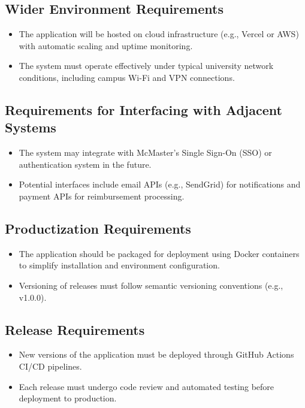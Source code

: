 \documentclass[12pt]{article}
\begin{document}
  \subsection{Wider Environment Requirements}
    \begin{itemize}
      \item The application will be hosted on cloud infrastructure (e.g., Vercel or AWS) with automatic scaling and uptime monitoring.
      \item The system must operate effectively under typical university network conditions, including campus Wi-Fi and VPN connections.
    \end{itemize}

  \subsection{Requirements for Interfacing with Adjacent Systems}
    \begin{itemize}
      \item The system may integrate with McMaster’s Single Sign-On (SSO) or authentication system in the future.
      \item Potential interfaces include email APIs (e.g., SendGrid) for notifications and payment APIs for reimbursement processing.
    \end{itemize}

  \subsection{Productization Requirements}
    \begin{itemize}
      \item The application should be packaged for deployment using Docker containers to simplify installation and environment configuration.
      \item Versioning of releases must follow semantic versioning conventions (e.g., v1.0.0).
    \end{itemize}

  \subsection{Release Requirements}
    \begin{itemize}
      \item New versions of the application must be deployed through GitHub Actions CI/CD pipelines.
      \item Each release must undergo code review and automated testing before deployment to production.
    \end{itemize}
\end{document}
